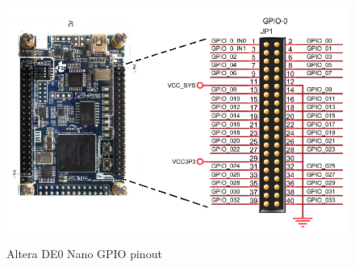 \begin{figure}[H]
\centering
\includegraphics[scale=.8]{Immagini/19}
\label{19}
\caption{Altera DE0 Nano GPIO pinout}
\end{figure}